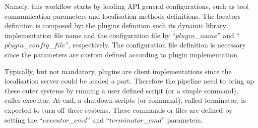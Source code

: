 Namely, this workflow starts by loading API general configurations, such as tool communication parameters and localisation methods definitions. The locators definition is composed by: the plugins definition such its dynamic library implementation file name and the configuration file by ``$plugin$\_$name$'' and ``$plugin$\_$config$\_$file$'', respectively.  The configuration file definition is necessary since the parameters are custom defined according to plugin implementation.

Typically, but not mandatory, plugins are client implementations since the localisation server could be loaded a part. Therefore the pipeline need to bring up these outer systems by running a user defined script (or a simple command), caller executor. At end, a shutdown scripts (or command), called terminator, is expected to turn off these systems. These commands or files are defined by setting the 
``$executor$\_$cmd$'' and ``$terminator$\_$cmd$'' parameters.

\begin{figure}[h!]
\end{figure}

